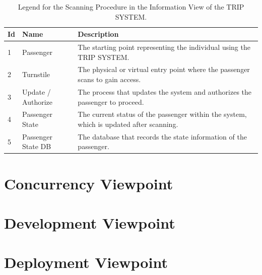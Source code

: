 \begin{table}[H]
    \centering
    \caption{Legend for the Scanning Procedure in the Information View of the TRIP SYSTEM.}
    \label{tab:scanning_procedure_legend}
    \begin{tabular}{@{}llp{10cm}@{}}
    \toprule
    \textbf{Id} & \textbf{Name} & \textbf{Description} \\
    \midrule
    1 & Passenger & The starting point representing the individual using the TRIP SYSTEM. \\
    2 & Turnstile & The physical or virtual entry point where the passenger scans to gain access. \\
    3 & Update / Authorize & The process that updates the system and authorizes the passenger to proceed. \\
    4 & Passenger State & The current status of the passenger within the system, which is updated after scanning. \\
    5 & Passenger State DB & The database that records the state information of the passenger. \\
    \bottomrule
\end{tabular}
\end{table}

\section*{Concurrency Viewpoint}

\section*{Development Viewpoint}

\section*{Deployment Viewpoint}